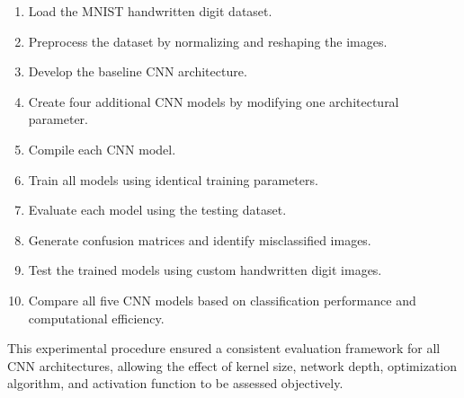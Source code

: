 \begin{enumerate}

\item Load the MNIST handwritten digit dataset.

\item Preprocess the dataset by normalizing and reshaping the images.

\item Develop the baseline CNN architecture.

\item Create four additional CNN models by modifying one architectural parameter.

\item Compile each CNN model.

\item Train all models using identical training parameters.

\item Evaluate each model using the testing dataset.

\item Generate confusion matrices and identify misclassified images.

\item Test the trained models using custom handwritten digit images.

\item Compare all five CNN models based on classification performance and computational efficiency.

\end{enumerate}

This experimental procedure ensured a consistent evaluation framework for all CNN architectures, allowing the effect of kernel size, network depth, optimization algorithm, and activation function to be assessed objectively.
